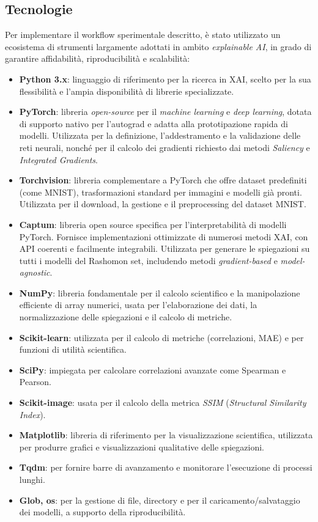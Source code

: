 \documentclass{article}
\begin{document}
\subsection{Tecnologie}
Per implementare il workflow sperimentale descritto, è stato utilizzato un
ecosistema di strumenti largamente adottati in ambito \emph{explainable AI}, in
grado di garantire affidabilità, riproducibilità e scalabilità:

\begin{itemize}
      \item \textbf{Python 3.x}: linguaggio di riferimento per la ricerca in XAI, scelto per la sua flessibilità e l’ampia disponibilità di librerie specializzate.
      \item \textbf{PyTorch}: libreria \emph{open-source} per il \emph{machine learning} e \emph{deep learning}, dotata di supporto nativo per l’autograd e adatta alla prototipazione rapida di modelli. Utilizzata per la definizione, l’addestramento e la validazione delle reti neurali, nonché per il calcolo dei gradienti richiesto dai metodi \emph{Saliency} e \emph{Integrated Gradients}.
      \item \textbf{Torchvision}: libreria complementare a PyTorch che offre dataset predefiniti (come MNIST), trasformazioni standard per immagini e modelli già pronti. Utilizzata per il download, la gestione e il preprocessing del dataset MNIST.
      \item \textbf{Captum}: libreria open source specifica per l’interpretabilità di modelli PyTorch. Fornisce implementazioni ottimizzate di numerosi metodi XAI, con API coerenti e facilmente integrabili. Utilizzata per generare le spiegazioni su tutti i modelli del Rashomon set, includendo metodi \emph{gradient-based} e \emph{model-agnostic}.
      \item \textbf{NumPy}: libreria fondamentale per il calcolo scientifico e la manipolazione efficiente di array numerici, usata per l’elaborazione dei dati, la normalizzazione delle spiegazioni e il calcolo di metriche.
      \item \textbf{Scikit-learn}: utilizzata per il calcolo di metriche (correlazioni, MAE) e per funzioni di utilità scientifica.
      \item \textbf{SciPy}: impiegata per calcolare correlazioni avanzate come Spearman e Pearson.
      \item \textbf{Scikit-image}: usata per il calcolo della metrica \emph{SSIM} (\emph{Structural Similarity Index}).
      \item \textbf{Matplotlib}: libreria di riferimento per la visualizzazione scientifica, utilizzata per produrre grafici e visualizzazioni qualitative delle spiegazioni.
      \item \textbf{Tqdm}: per fornire barre di avanzamento e monitorare l’esecuzione di processi lunghi.
      \item \textbf{Glob, os}: per la gestione di file, directory e per il caricamento/salvataggio dei modelli, a supporto della riproducibilità.
\end{itemize}
\end{document}
